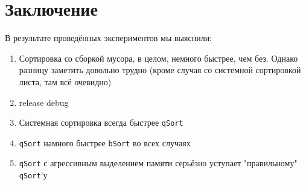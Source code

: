 \section{Заключение}

В результате проведённых экспериментов мы выяснили:
\begin{enumerate}
  \item Сортировка со сборкой мусора, в целом, немного быстрее, чем без. Однако разницу заметить довольно трудно (кроме случая со системной сортировкой листа, там всё очевидно)
  \item release debug
  \item Системная сортировка всегда быстрее \verb|qSort|
  \item \verb|qSort| намного быстрее \verb|bSort| во всех случаях
  \item \verb|qSort| с агрессивным выделением памяти серьёзно уступает "правильному" \verb|qSort|'у
\end{enumerate}
